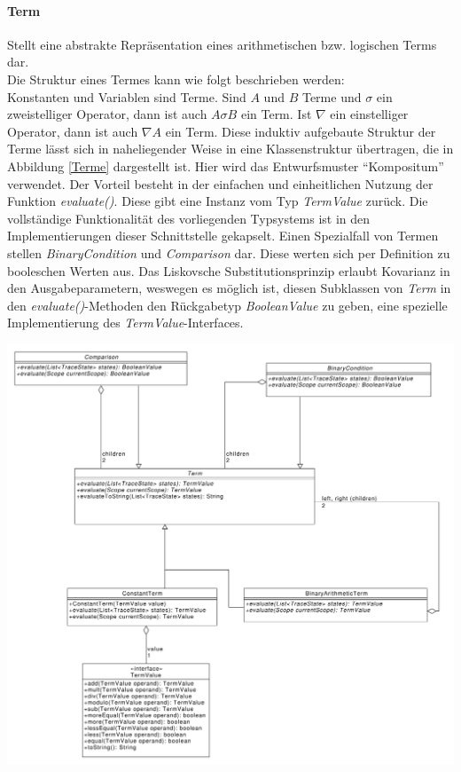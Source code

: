 \documentclass[parskip=full]{scrartcl}
\begin{document}
\paragraph{Term}
Stellt eine abstrakte Repräsentation eines arithmetischen bzw. logischen Terms dar. 
\\
Die Struktur eines Termes kann wie folgt beschrieben werden: \\
Konstanten und Variablen sind Terme. Sind $A$ und $B$ Terme und $\sigma$ ein zweistelliger Operator, dann ist auch $A\sigma B$ ein Term. Ist $\nabla$ ein einstelliger Operator, dann ist auch $\nabla A$ ein Term. Diese induktiv aufgebaute Struktur der Terme lässt sich in naheliegender Weise in eine Klassenstruktur übertragen, die in Abbildung \ref{Terme} dargestellt ist. Hier wird das Entwurfsmuster \enquote{Kompositum} verwendet. Der Vorteil besteht in der einfachen und einheitlichen Nutzung der Funktion \textit{evaluate()}. Diese gibt eine Instanz vom Typ \textit{TermValue} zurück. Die vollständige Funktionalität des vorliegenden Typsystems ist in den Implementierungen dieser Schnittstelle gekapselt. Einen Spezialfall von Termen stellen \textit{BinaryCondition} und \textit{Comparison} dar. Diese werten sich per Definition zu booleschen Werten aus. Das Liskovsche Substitutionsprinzip erlaubt Kovarianz in den Ausgabeparametern, weswegen es möglich ist, diesen Subklassen von \textit{Term} in den \textit{evaluate()}-Methoden den Rückgabetyp \textit{BooleanValue} zu geben, eine spezielle Implementierung des \textit{TermValue}-Interfaces.
\begin{center}
\includegraphics[width=1.0\textwidth]{diagrammIdeenUmlet/TermCondition.pdf}
\label{Terme}
\end{center}
\end{document}

